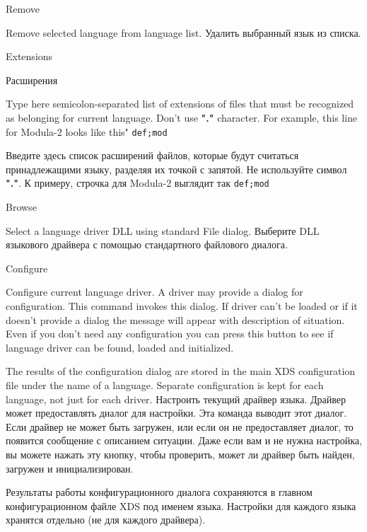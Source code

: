 \begin{popup}
\caption{Remove}

\ifenglish
Remove selected language from language list.
\else
Удалить выбранный язык из списка.
\fi
\end{popup}

\begin{popup}
\ifenglish
\caption{Extensions}
\else
\caption{Расширения}
\fi
{}

\ifenglish
Type here semicolon-separated list of extensions of files that must
be recognized as belonging for current language. Don't use {\bf "."}
character. For example, this line for Modula-2 looks like this"
\verb'def;mod'

\else
Введите здесь список расширений файлов, которые будут считаться принадлежащими
языку, разделяя их точкой с запятой. Не используйте символ {\bf "."}.
К примеру, строчка для Modula-2 выглядит так \verb'def;mod'
\fi
                     
\end{popup}

\begin{popup}
\caption{Browse}

\ifenglish
Select a language driver DLL using standard File dialog.
\else
Выберите DLL языкового драйвера с помощью стандартного файлового диалога.
\fi
\end{popup}

\begin{popup}
\caption{Configure}

\ifenglish
Configure current language driver. A driver may provide a dialog for configuration.
This command invokes this dialog. If driver can't be loaded or if it doesn't
provide a dialog the message will appear with description of situation.
Even if you don't need any configuration you can press this button to see if language
driver can be found, loaded and initialized.

The results of the configuration dialog are stored in the main XDS configuration
file under the name of a language. Separate configuration is kept for each language,
not just for each driver.
\else
Настроить текущий драйвер языка. Драйвер может предоставлять диалог для настройки.
Эта команда выводит этот диалог. Если драйвер не может быть загружен, или если он
не предоставляет диалог, то появится сообщение с описанием ситуации.
Даже если вам и не нужна настройка, вы можете нажать эту кнопку, чтобы проверить,
может ли драйвер быть найден, загружен и инициализирован. 

Результаты работы конфигурационного диалога сохраняются в главном конфигурационном 
файле XDS под именем языка. Настройки для каждого языка хранятся отдельно (не для 
каждого драйвера).
\fi
\end{popup}
